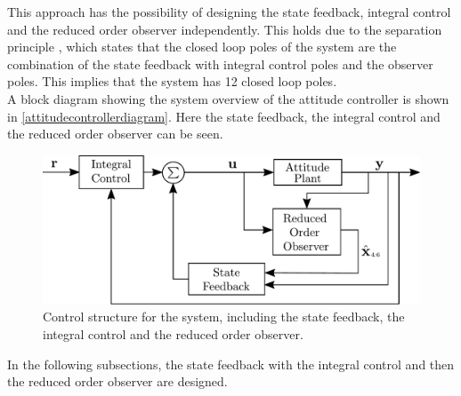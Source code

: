 This approach has the possibility of designing the state feedback, integral control and the reduced order observer independently. This holds due to the separation principle \cite{ObserverChristoffer}, which states that the closed loop poles of the system are the combination of the state feedback with integral control poles and the observer poles. This implies that the system has 12 closed loop poles.%
\\A block diagram showing the system overview of the attitude controller is shown in \autoref{attitudecontrollerdiagram}. Here the state feedback, the integral control and the reduced order observer can be seen.
\vspace{-0.3 cm}
\begin{figure}[H]
	\includegraphics[scale=.36]{figures/AttitudeControlDiagram}
	\centering
	\caption{Control structure for the system, including the state feedback, the integral control and the reduced order observer.}
	\label{attitudecontrollerdiagram}
\end{figure}
In the following subsections, the state feedback with the integral control and then the reduced order observer are designed.

%
%